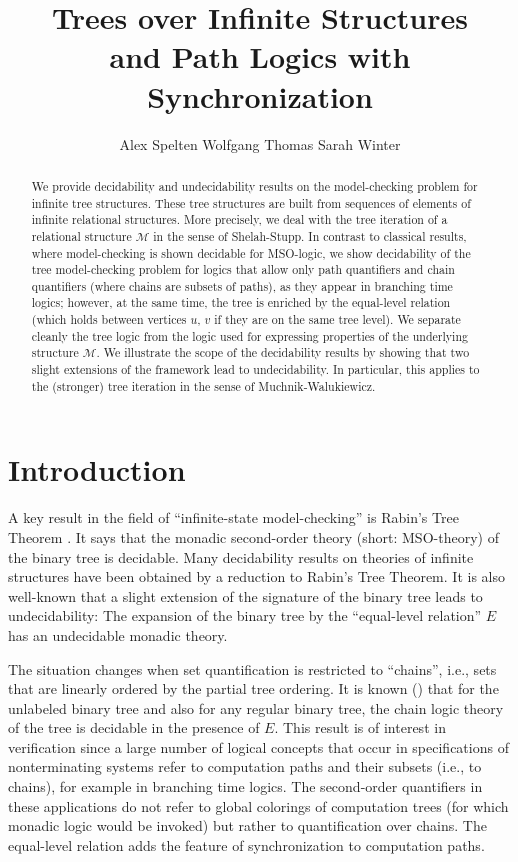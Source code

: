 \documentclass[copyright,creativecommons]{eptcs}
\title{Trees over Infinite Structures \\ and Path Logics with Synchronization}
\author{Alex Spelten \qquad Wolfgang Thomas \qquad Sarah Winter
\institute{RWTH Aachen University\\ Germany}
\email{\{spelten,thomas,winter\}@automata.rwth-aachen.de}
}
\theoremstyle{plain}
\theoremstyle{nonumberplain}
\newcommand{\m}{\ensuremath{\mathcal{M}}}
\begin{document}
\maketitle

\begin{abstract}
We provide decidability and undecidability results on 
the model-checking problem for infinite tree structures. 
These tree structures are built from sequences of  
elements of infinite relational structures. More 
precisely, we deal with the tree iteration of a relational 
structure $\m$ in the sense of Shelah-Stupp. 
In contrast to classical results, where 
model-checking is shown decidable for MSO-logic, we 
show decidability of the tree model-checking problem 
for logics that allow only path quantifiers and chain 
quantifiers (where chains are subsets of paths), as they appear 
in branching time logics; however, at the same time,  
the tree is enriched by the equal-level relation 
(which holds between vertices $u$, $v$ if they are on 
the same tree level). We separate cleanly the tree logic 
from the logic used for expressing properties of the underlying 
structure $\m$. 
We illustrate the scope of the decidability results by showing 
that two slight extensions of the framework lead to undecidability.
In particular, this applies to the (stronger) tree iteration in 
the sense of Muchnik-Walukiewicz. 

\end{abstract}



\section{Introduction}\label{sec_intro}



A key result in the field of ``infinite-state model-checking'' is 
Rabin's Tree Theorem \cite{rab69}. 
It says that the monadic second-order theory (short: MSO-theory) 
of the binary tree 
is decidable. Many decidability results on theories of infinite
structures have been obtained by a reduction to Rabin's Tree Theorem. 
It is also well-known that a slight extension of the signature of 
the binary tree leads to undecidability: The expansion of the binary tree by the ``equal-level relation'' $E$ 
has an undecidable monadic theory. 

The situation changes when set quantification is restricted to ``chains'', 
i.e., sets that are linearly ordered by the partial tree ordering. It is known 
(\cite{tho90}) that for the unlabeled binary tree and also for any regular binary 
tree, the chain logic theory of the tree is decidable in the presence of $E$. 
This result is of interest in verification since a large number of logical 
concepts that occur in specifications of nonterminating systems refer to 
computation paths and their subsets (i.e., to chains), for example in branching time 
logics. The second-order quantifiers in these applications do not refer to global colorings 
of computation trees (for which monadic logic would be invoked) but rather 
to quantification over chains. The equal-level relation adds the feature 
of synchronization to computation paths. 
\end{document}
